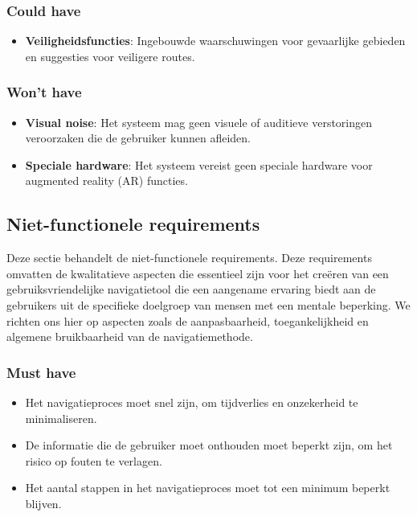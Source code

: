 \subsubsection{Could have}
\begin{itemize}
    \item \textbf{Veiligheidsfuncties}: Ingebouwde waarschuwingen voor gevaarlijke gebieden en suggesties voor veiligere routes.
\end{itemize}

\subsubsection{Won't have}
\begin{itemize}
    \item \textbf{Visual noise}: Het systeem mag geen visuele of auditieve verstoringen veroorzaken die de gebruiker kunnen afleiden.
    \item \textbf{Speciale hardware}: Het systeem vereist geen speciale hardware voor augmented reality (AR) functies.
\end{itemize}

\subsection{Niet-functionele requirements}
\label{sec:niet-functionele-requirements}

Deze sectie behandelt de niet-functionele requirements. Deze requirements omvatten de kwalitatieve aspecten die essentieel zijn voor het creëren van een gebruiksvriendelijke navigatietool die een aangename ervaring biedt aan de gebruikers uit de specifieke doelgroep van mensen met een mentale beperking. We richten ons hier op aspecten zoals de aanpasbaarheid, toegankelijkheid en algemene bruikbaarheid van de navigatiemethode.

\subsubsection{Must have}
\begin{itemize}
    \item Het navigatieproces moet snel zijn, om tijdverlies en onzekerheid te minimaliseren.
    \item De informatie die de gebruiker moet onthouden moet beperkt zijn, om het risico op fouten te verlagen.
    \item Het aantal stappen in het navigatieproces moet tot een minimum beperkt blijven.
\end{itemize}

